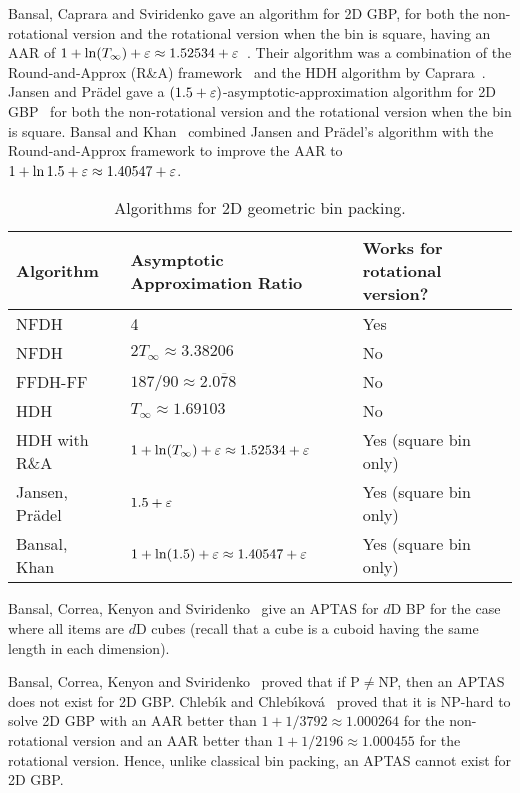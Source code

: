 Bansal, Caprara and Sviridenko gave an algorithm for 2D GBP,
for both the non-rotational version and the rotational version when the bin is square,
having an AAR of $1 + \ln(T_{\infty}) + \varepsilon \approx 1.52534 + \varepsilon$~\cite{rna}.
Their algorithm was a combination of the Round-and-Approx (R\&A) framework~\cite{rna}
and the HDH algorithm by Caprara~\cite{caprara2008}.
Jansen and Pr\"adel gave a $(1.5 + \varepsilon)$-asymptotic-approximation
algorithm for 2D GBP~\cite{JansenP2013,jansen2016new}
for both the non-rotational version and the rotational version when the bin is square.
Bansal and Khan~\cite{bansal2014binpacking} combined Jansen and Pr\"adel's algorithm
with the Round-and-Approx framework to improve the AAR to
$1 + \ln 1.5 + \varepsilon \approx 1.40547 + \varepsilon$.

\begin{table}[ht]
\centering
\caption{Algorithms for 2D geometric bin packing.}
\begin{tabular}{lll}
\toprule Algorithm & Asymptotic Approximation Ratio & Works for rotational version?
\\ \midrule NFDH~\cite{coffman1980performance}
    & 4 & Yes
\\[\defaultaddspace] NFDH~\cite{coffman1980performance,caprara2008,baker1981tight}
    & $2T_{\infty} \approx 3.38206$ & No
\\[\defaultaddspace] FFDH-FF~\cite{coffman1980performance,caprara2008}
    & $187/90 \approx 2.0\overline{7}8$ & No
\\[\defaultaddspace] HDH~\cite{caprara2008}
    & $T_\infty \approx 1.69103$ & No
\\[\defaultaddspace] HDH with R\&A~\cite{rna}
    & $1 + \ln(T_\infty) + \varepsilon \approx 1.52534 + \varepsilon$
    & Yes (square bin only)
\\[\defaultaddspace] Jansen, Pr\"adel~\cite{JansenP2013,jansen2016new}
    & $1.5 + \varepsilon$
    & Yes (square bin only)
\\[\defaultaddspace] Bansal, Khan~\cite{bansal2014binpacking}
    & $1 + \ln(1.5) + \varepsilon \approx 1.40547 + \varepsilon$
    & Yes (square bin only)
\\ \bottomrule
\end{tabular}
\label{table:2gbp}
\end{table}

Bansal, Correa, Kenyon and Sviridenko~\cite{bansal2006bin}
give an APTAS for $d$D BP for the case where all items are $d$D cubes
(recall that a cube is a cuboid having the same length in each dimension).

Bansal, Correa, Kenyon and Sviridenko~\cite{bansal2006bin}
proved that if P$\neq$NP, then an APTAS does not exist for 2D GBP.
Chleb{\'\i}k and Chleb{\'\i}kov\'a~\cite{chlebik2009hardness} proved that it is NP-hard to solve
2D GBP with an AAR better than $1+1/3792 \approx 1.000264$ for the non-rotational version
and an AAR better than $1+1/2196 \approx 1.000455$ for the rotational version.
Hence, unlike classical bin packing, an APTAS cannot exist for 2D GBP.

